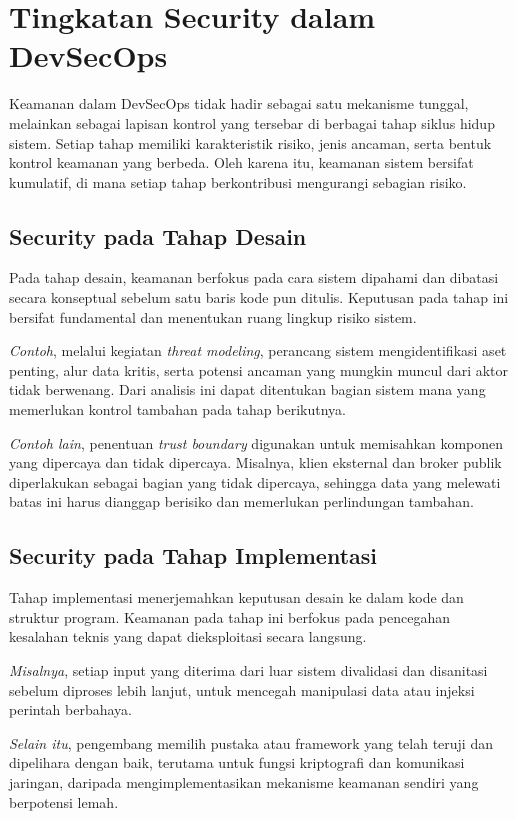 \section{Tingkatan Security dalam DevSecOps}

Keamanan dalam DevSecOps tidak hadir sebagai satu mekanisme tunggal, melainkan sebagai lapisan kontrol yang tersebar di berbagai tahap siklus hidup sistem. Setiap tahap memiliki karakteristik risiko, jenis ancaman, serta bentuk kontrol keamanan yang berbeda. Oleh karena itu, keamanan sistem bersifat kumulatif, di mana setiap tahap berkontribusi mengurangi sebagian risiko.

\subsection{Security pada Tahap Desain}

Pada tahap desain, keamanan berfokus pada cara sistem dipahami dan dibatasi secara konseptual sebelum satu baris kode pun ditulis. Keputusan pada tahap ini bersifat fundamental dan menentukan ruang lingkup risiko sistem.

\emph{Contoh}, melalui kegiatan \emph{threat modeling}, perancang sistem mengidentifikasi aset penting, alur data kritis, serta potensi ancaman yang mungkin muncul dari aktor tidak berwenang. Dari analisis ini dapat ditentukan bagian sistem mana yang memerlukan kontrol tambahan pada tahap berikutnya.

\emph{Contoh lain}, penentuan \emph{trust boundary} digunakan untuk memisahkan komponen yang dipercaya dan tidak dipercaya. Misalnya, klien eksternal dan broker publik diperlakukan sebagai bagian yang tidak dipercaya, sehingga data yang melewati batas ini harus dianggap berisiko dan memerlukan perlindungan tambahan.

\subsection{Security pada Tahap Implementasi}

Tahap implementasi menerjemahkan keputusan desain ke dalam kode dan struktur program. Keamanan pada tahap ini berfokus pada pencegahan kesalahan teknis yang dapat dieksploitasi secara langsung.

\emph{Misalnya}, setiap input yang diterima dari luar sistem divalidasi dan disanitasi sebelum diproses lebih lanjut, untuk mencegah manipulasi data atau injeksi perintah berbahaya.

\emph{Selain itu}, pengembang memilih pustaka atau framework yang telah teruji dan dipelihara dengan baik, terutama untuk fungsi kriptografi dan komunikasi jaringan, daripada mengimplementasikan mekanisme keamanan sendiri yang berpotensi lemah.

